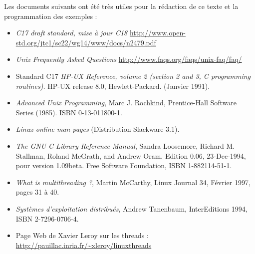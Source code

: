
Les documents suivants ont été très utiles pour la rédaction
de ce texte et la programmation des exemples :

\begin{itemize}
\item \emph{C17 draft standard, mise à jour C18} \url{http://www.open-std.org/jtc1/sc22/wg14/www/docs/n2479.pdf}
  
\item \emph{Unix Frequently Asked Questions}
  \url{http://www.faqs.org/faqs/unix-faq/faq/}

\item {Standard C17} 
\emph{HP-UX Reference, volume 2 (section 2 and 3, C programming routines).}
HP-UX release 8.0, Hewlett-Packard. (Janvier 1991).

\item 
\emph{Advanced Unix Programming}, Marc J. Rochkind, Prentice-Hall Software Series
(1985).
ISBN 0-13-011800-1.

\item \emph{Linux online man pages} (Distribution Slackware 3.1).

\item \emph{The GNU C Library Reference Manual}, Sandra Loosemore,
Richard M. Stallman, Roland McGrath, and Andrew Oram. Edition 0.06,
23-Dec-1994, pour version 1.09beta. Free Software Foundation,
ISBN 1-882114-51-1.

\item 
\emph{What is multithreading ?}, Martin McCarthy, Linux Journal 34, 
Février 1997, pages 31 à 40.

\item \emph{Systèmes d'exploitation distribués}, Andrew Tanenbaum,
InterEditions 1994, ISBN 2-7296-0706-4. 

\item  
Page Web de Xavier Leroy sur les threads :
\url{http://pauillac.inria.fr/~xleroy/linuxthreads}
\end{itemize}
